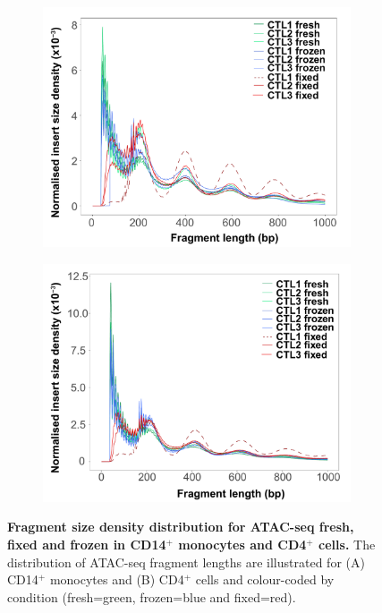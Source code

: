 \begin{figure}[htbp]
\centering
\begin{subfigure}{0.5\textwidth}
\centering
\includegraphics[width=\textwidth]{./Results1/pdfs/Core_ATAC_CD14_fresh_frozen_fixed_frag_size_distribution}
\caption{\textbf{}}
\end{subfigure}%
\begin{subfigure}{0.5\textwidth}
\centering
\includegraphics[width=\textwidth]{./Results1/pdfs/Core_ATAC_CD4_fresh_frozen_fixed_frag_size_distribution}
\caption{\textbf{}}
\end{subfigure}
\caption[Fragment size density distribution for ATAC-seq fresh, fixed and frozen in CD14$^+$ monocytes and CD4$^+$ cells.]{\textbf{Fragment size density distribution for ATAC-seq fresh, fixed and frozen in CD14$^+$ monocytes and CD4$^+$ cells.} The distribution of ATAC-seq fragment lengths are illustrated for (A) CD14$^+$ monocytes and (B) CD4$^+$ cells and colour-coded by condition (fresh=green, frozen=blue and fixed=red).}
\label{figure:Core_ATAC_all_fragment_size_distribution}
\end{figure} 



